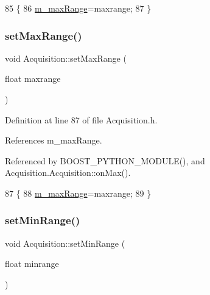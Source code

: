 \begin{DoxyCode}
85                                   \{
86     \hyperlink{classAcquisition_a45478629e9db582470b4b158edb46616}{m\_maxRange}=maxrange;
87   \}
\end{DoxyCode}
\mbox{\label{classAcquisition_a786da6cff5428020034be23e554e0e1b}} 
\subsubsection{\texorpdfstring{set\+Max\+Range()}{setMaxRange()}\hspace{0.1cm}{\footnotesize\ttfamily [2/2]}}
{\footnotesize\ttfamily void Acquisition\+::set\+Max\+Range (\begin{DoxyParamCaption}\item[{float}]{maxrange }\end{DoxyParamCaption})\hspace{0.3cm}{\ttfamily [inline]}}



Definition at line 87 of file Acquisition.\+h.



References m\+\_\+max\+Range.



Referenced by B\+O\+O\+S\+T\+\_\+\+P\+Y\+T\+H\+O\+N\+\_\+\+M\+O\+D\+U\+L\+E(), and Acquisition.\+Acquisition\+::on\+Max().


\begin{DoxyCode}
87                                   \{
88     \hyperlink{classAcquisition_a45478629e9db582470b4b158edb46616}{m\_maxRange}=maxrange;
89   \}
\end{DoxyCode}
\mbox{\label{classAcquisition_a8a15ffc6e539a3ae12efe4bea1ca7587}} 
\subsubsection{\texorpdfstring{set\+Min\+Range()}{setMinRange()}\hspace{0.1cm}{\footnotesize\ttfamily [1/2]}}
{\footnotesize\ttfamily void Acquisition\+::set\+Min\+Range (\begin{DoxyParamCaption}\item[{float}]{minrange }\end{DoxyParamCaption})\hspace{0.3cm}{\ttfamily [inline]}}



